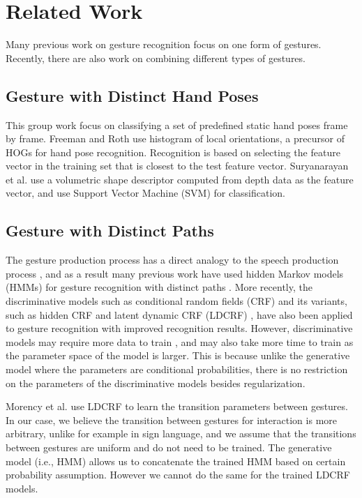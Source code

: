 \documentclass[conference]{IEEEtran}
\begin{document}
\section{Related Work}\label{sec:related}
Many previous work on gesture recognition focus on one form of gestures.
Recently, there are also work on combining different types of gestures.

\subsection{Gesture with Distinct Hand Poses}
This group work focus on classifying a set of predefined static hand
poses frame by frame. Freeman and Roth \cite{freeman95} use histogram of local
orientations, a precursor of HOGs for hand pose recognition. Recognition is based on selecting the feature vector in the training set that is closest to the test feature
vector. Suryanarayan et al. \cite{suryanarayan2010} use a volumetric shape
descriptor computed from depth data as the feature vector, and use Support
Vector Machine (SVM) for classification.

\subsection{Gesture with Distinct Paths}
The gesture production process has a direct analogy to the
speech production process \cite{Kettebekov01}, and as a result many previous
work have used hidden Markov models (HMMs) for gesture recognition with distinct
paths \cite{Starner95, sharma00}. More recently, the discriminative models such as
conditional random fields (CRF) and its variants, such as hidden CRF
\cite{wang06} and latent dynamic CRF (LDCRF) \cite{morency07}, have also been
applied to gesture recognition with improved recognition results.
However, discriminative models may require more data to train \cite{ng02},
and may also take more time to train as the parameter space of the model is
larger. This is because unlike the generative model where the parameters are
conditional probabilities, there is no restriction on the parameters of the
discriminative models besides regularization.

Morency et al. \cite{morency07} use LDCRF to learn the transition parameters
between gestures. In our case, we believe the transition between gestures for interaction is more arbitrary,
unlike for example in sign language, and we assume that the transitions between
gestures are uniform and do not need to be trained. The generative model (i.e., HMM) allows us to concatenate the trained HMM based
on certain probability assumption. However we cannot do the same for the trained
LDCRF models.
\end{document}
